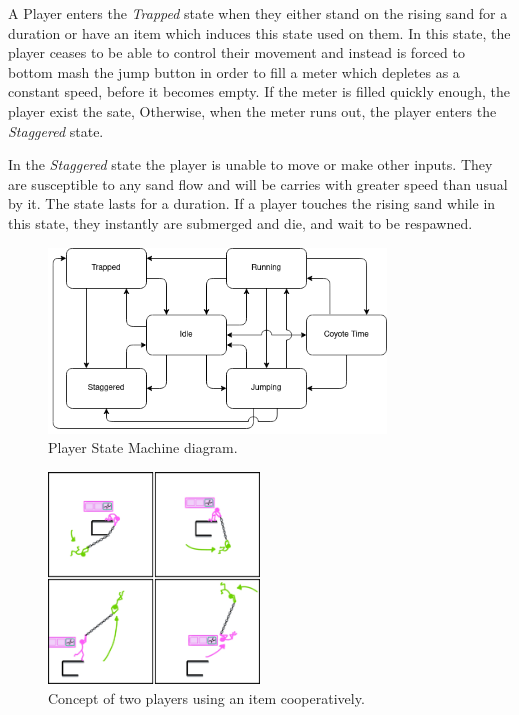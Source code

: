 A Player enters the \emph{Trapped} state when they either stand on the rising sand for a duration or have an item which induces this state used on them. In this state, the player ceases to be able to control their movement and instead is forced to bottom mash the jump button in order to fill a meter which depletes as a constant speed, before it becomes empty. If the meter is filled quickly enough, the player exist the sate, Otherwise, when the meter runs out, the player enters the \emph{Staggered} state.

In the \emph{Staggered} state the player is unable to move or make other inputs. They are susceptible to any sand flow and will be carries with greater speed than usual by it. The state lasts for a duration. If a player touches the rising sand while in this state, they instantly are submerged and die, and wait to be respawned. 


\begin{figure}
    \centering
    \includegraphics[width=0.8\textwidth]{figures/state_diag.png}
    \caption{Player State Machine diagram.}
    \label{fig:state_machine}
\end{figure}


\begin{figure}[h]
    \centering
    \includegraphics[width=0.5\textwidth]{figures/topmeifyoucan_concept_rope_coop.png}
    \caption{Concept of two players using an item cooperatively.}
    \label{fig:concept-coop}
\end{figure}

